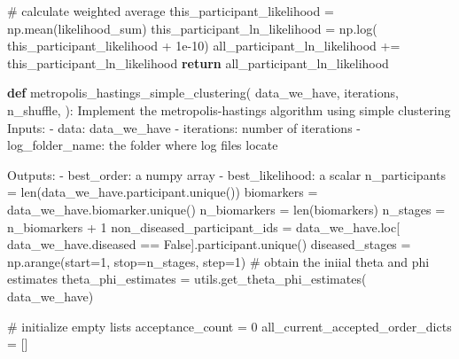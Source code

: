 \documentclass[
  letterpaper,
  DIV=11,
  numbers=noendperiod]{scrreprt}
\newenvironment{Shaded}{\begin{snugshade}}{\end{snugshade}}
\newcommand{\BuiltInTok}[1]{\textcolor[rgb]{0.00,0.23,0.31}{#1}}
\newcommand{\CommentTok}[1]{\textcolor[rgb]{0.37,0.37,0.37}{#1}}
\newcommand{\ControlFlowTok}[1]{\textcolor[rgb]{0.00,0.23,0.31}{\textbf{#1}}}
\newcommand{\DecValTok}[1]{\textcolor[rgb]{0.68,0.00,0.00}{#1}}
\newcommand{\FloatTok}[1]{\textcolor[rgb]{0.68,0.00,0.00}{#1}}
\newcommand{\KeywordTok}[1]{\textcolor[rgb]{0.00,0.23,0.31}{\textbf{#1}}}
\newcommand{\NormalTok}[1]{\textcolor[rgb]{0.00,0.23,0.31}{#1}}
\newcommand{\OperatorTok}[1]{\textcolor[rgb]{0.37,0.37,0.37}{#1}}
\newcommand{\VariableTok}[1]{\textcolor[rgb]{0.07,0.07,0.07}{#1}}
\begin{document}
\begin{Shaded}
\begin{Highlighting}[]
            \CommentTok{\# calculate weighted average}
\NormalTok{            this\_participant\_likelihood }\OperatorTok{=}\NormalTok{ np.mean(likelihood\_sum)}
\NormalTok{            this\_participant\_ln\_likelihood }\OperatorTok{=}\NormalTok{ np.log(}
\NormalTok{                this\_participant\_likelihood }\OperatorTok{+} \FloatTok{1e{-}10}\NormalTok{)}
\NormalTok{        all\_participant\_ln\_likelihood }\OperatorTok{+=}\NormalTok{ this\_participant\_ln\_likelihood}
    \ControlFlowTok{return}\NormalTok{ all\_participant\_ln\_likelihood}

\KeywordTok{def}\NormalTok{ metropolis\_hastings\_simple\_clustering(}
\NormalTok{    data\_we\_have,}
\NormalTok{    iterations,}
\NormalTok{    n\_shuffle,}
\NormalTok{):}
    \CommentTok{\textquotesingle{}\textquotesingle{}\textquotesingle{}Implement the metropolis{-}hastings algorithm using simple clustering}
\CommentTok{    Inputs: }
\CommentTok{        {-} data: data\_we\_have}
\CommentTok{        {-} iterations: number of iterations}
\CommentTok{        {-} log\_folder\_name: the folder where log files locate}

\CommentTok{    Outputs:}
\CommentTok{        {-} best\_order: a numpy array}
\CommentTok{        {-} best\_likelihood: a scalar }
\CommentTok{    \textquotesingle{}\textquotesingle{}\textquotesingle{}}
\NormalTok{    n\_participants }\OperatorTok{=} \BuiltInTok{len}\NormalTok{(data\_we\_have.participant.unique())}
\NormalTok{    biomarkers }\OperatorTok{=}\NormalTok{ data\_we\_have.biomarker.unique()}
\NormalTok{    n\_biomarkers }\OperatorTok{=} \BuiltInTok{len}\NormalTok{(biomarkers)}
\NormalTok{    n\_stages }\OperatorTok{=}\NormalTok{ n\_biomarkers }\OperatorTok{+} \DecValTok{1}
\NormalTok{    non\_diseased\_participant\_ids }\OperatorTok{=}\NormalTok{ data\_we\_have.loc[}
\NormalTok{        data\_we\_have.diseased }\OperatorTok{==} \VariableTok{False}\NormalTok{].participant.unique()}
\NormalTok{    diseased\_stages }\OperatorTok{=}\NormalTok{ np.arange(start}\OperatorTok{=}\DecValTok{1}\NormalTok{, stop}\OperatorTok{=}\NormalTok{n\_stages, step}\OperatorTok{=}\DecValTok{1}\NormalTok{)}
    \CommentTok{\# obtain the iniial theta and phi estimates}
\NormalTok{    theta\_phi\_estimates }\OperatorTok{=}\NormalTok{ utils.get\_theta\_phi\_estimates(}
\NormalTok{        data\_we\_have)}

    \CommentTok{\# initialize empty lists}
\NormalTok{    acceptance\_count }\OperatorTok{=} \DecValTok{0}
\NormalTok{    all\_current\_accepted\_order\_dicts }\OperatorTok{=}\NormalTok{ []}


\end{Highlighting}
\end{Shaded}
\end{document}
